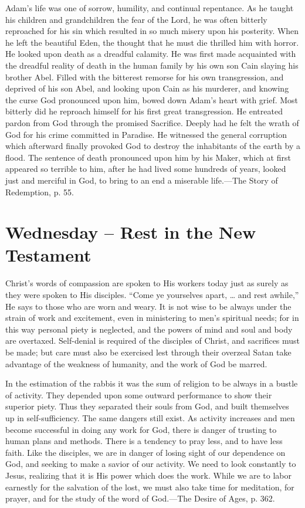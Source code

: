 \documentclass[a4paper, 10pt, twoside, headings=small]{scrartcl}
\begin{document}
\begin{multicols}{2}
Adam’s life was one of sorrow, humility, and continual repentance. As he taught his children and grandchildren the fear of the Lord, he was often bitterly reproached for his sin which resulted in so much misery upon his posterity. When he left the beautiful Eden, the thought that he must die thrilled him with horror. He looked upon death as a dreadful calamity. He was first made acquainted with the dreadful reality of death in the human family by his own son Cain slaying his brother Abel. Filled with the bitterest remorse for his own transgression, and deprived of his son Abel, and looking upon Cain as his murderer, and knowing the curse God pronounced upon him, bowed down Adam’s heart with grief. Most bitterly did he reproach himself for his first great transgression. He entreated pardon from God through the promised Sacrifice. Deeply had he felt the wrath of God for his crime committed in Paradise. He witnessed the general corruption which afterward finally provoked God to destroy the inhabitants of the earth by a flood. The sentence of death pronounced upon him by his Maker, which at first appeared so terrible to him, after he had lived some hundreds of years, looked just and merciful in God, to bring to an end a miserable life.—The Story of Redemption, p. 55.

\section*{Wednesday – Rest in the New Testament}

Christ’s words of compassion are spoken to His workers today just as surely as they were spoken to His disciples. “Come ye yourselves apart, … and rest awhile,” He says to those who are worn and weary. It is not wise to be always under the strain of work and excitement, even in ministering to men’s spiritual needs; for in this way personal piety is neglected, and the powers of mind and soul and body are overtaxed. Self-denial is required of the disciples of Christ, and sacrifices must be made; but care must also be exercised lest through their overzeal Satan take advantage of the weakness of humanity, and the work of God be marred.

In the estimation of the rabbis it was the sum of religion to be always in a bustle of activity. They depended upon some outward performance to show their superior piety. Thus they separated their souls from God, and built themselves up in self-sufficiency. The same dangers still exist. As activity increases and men become successful in doing any work for God, there is danger of trusting to human plans and methods. There is a tendency to pray less, and to have less faith. Like the disciples, we are in danger of losing sight of our dependence on God, and seeking to make a savior of our activity. We need to look constantly to Jesus, realizing that it is His power which does the work. While we are to labor earnestly for the salvation of the lost, we must also take time for meditation, for prayer, and for the study of the word of God.—The Desire of Ages, p. 362.


\end{multicols}
\end{document}
